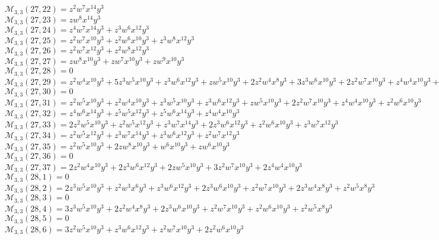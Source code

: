 \documentclass[12pt]{memoireuqam1.3}
\begin{document}
$\mathcal{M}_{3,3}(27,22)=z^2w^7x^{14}y^3$\\
$\mathcal{M}_{3,3}(27,23)=zw^8x^{14}y^3$\\
$\mathcal{M}_{3,3}(27,24)=z^4w^7x^{14}y^3+z^3w^6x^{12}y^3$\\
$\mathcal{M}_{3,3}(27,25)=z^2w^7x^{10}y^3+z^2w^6x^{10}y^3+z^3w^8x^{12}y^3$\\
$\mathcal{M}_{3,3}(27,26)=z^2w^7x^{12}y^3+z^2w^8x^{12}y^3$\\
$\mathcal{M}_{3,3}(27,27)=zw^8x^{10}y^3+zw^7x^{10}y^3+zw^9x^{10}y^3$\\
$\mathcal{M}_{3,3}(27,28)=0$\\
$\mathcal{M}_{3,3}(27,29)=z^2w^4x^{10}y^3+5z^3w^5x^{10}y^3+z^3w^6x^{12}y^3+zw^5x^{10}y^3+2z^2w^4x^8y^3+3z^3w^6x^{10}y^3+2z^2w^7x^{10}y^3+z^4w^4x^{10}y^3+z^2w^5x^8y^3$\\
$\mathcal{M}_{3,3}(27,30)=0$\\
$\mathcal{M}_{3,3}(27,31)=z^2w^5x^{10}y^3+z^2w^4x^{10}y^3+z^3w^5x^{10}y^3+z^3w^6x^{12}y^3+zw^5x^{10}y^3+2z^2w^7x^{10}y^3+z^4w^4x^{10}y^3+z^2w^6x^{10}y^3$\\
$\mathcal{M}_{3,3}(27,32)=z^4w^6x^{14}y^3+z^5w^5x^{12}y^3+z^5w^6x^{14}y^3+z^4w^4x^{10}y^3$\\
$\mathcal{M}_{3,3}(27,33)=2z^2w^5x^{10}y^3+z^2w^5x^{12}y^3+z^3w^7x^{14}y^3+2z^3w^6x^{12}y^3+z^2w^6x^{10}y^3+z^3w^7x^{12}y^3$\\
$\mathcal{M}_{3,3}(27,34)=z^2w^5x^{12}y^3+z^3w^7x^{14}y^3+z^3w^6x^{12}y^3+z^2w^7x^{12}y^3$\\
$\mathcal{M}_{3,3}(27,35)=z^2w^5x^{10}y^3+2zw^8x^{10}y^3+w^6x^{10}y^3+zw^6x^{10}y^3$\\
$\mathcal{M}_{3,3}(27,36)=0$\\
$\mathcal{M}_{3,3}(27,37)=2z^2w^4x^{10}y^3+2z^3w^6x^{12}y^3+2zw^5x^{10}y^3+3z^2w^7x^{10}y^3+2z^4w^4x^{10}y^3$\\
$\mathcal{M}_{3,3}(28,1)=0$\\
$\mathcal{M}_{3,3}(28,2)=2z^3w^5x^{10}y^3+z^2w^3x^6y^3+z^3w^6x^{12}y^3+2z^3w^6x^{10}y^3+z^2w^7x^{10}y^3+2z^3w^4x^8y^3+z^2w^5x^8y^3$\\
$\mathcal{M}_{3,3}(28,3)=0$\\
$\mathcal{M}_{3,3}(28,4)=3z^3w^5x^{10}y^3+2z^2w^4x^8y^3+2z^3w^6x^{10}y^3+z^2w^7x^{10}y^3+z^2w^6x^{10}y^3+z^2w^5x^8y^3$\\
$\mathcal{M}_{3,3}(28,5)=0$\\
$\mathcal{M}_{3,3}(28,6)=3z^2w^5x^{10}y^3+z^3w^6x^{12}y^3+z^2w^7x^{10}y^3+2z^2w^6x^{10}y^3$\\
\end{document}
